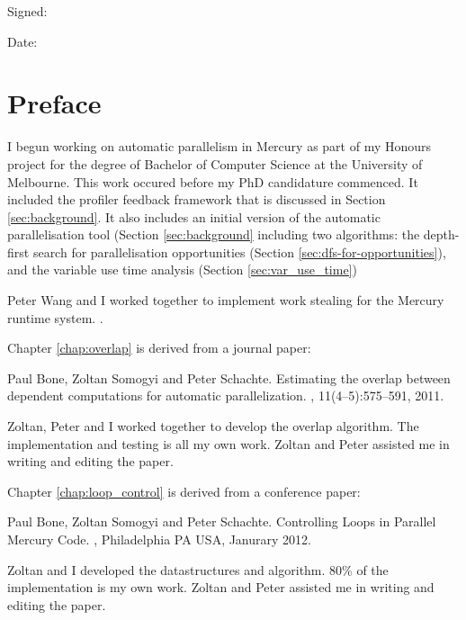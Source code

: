 \documentclass[a4paper,twoside]{report}
\begin{document}
\noindent Signed:

\vspace{1em}

\noindent Date:

\chapter*{Preface}

I begun working on automatic parallelism in Mercury as part of my Honours project
for the degree of Bachelor of Computer Science at the University of Melbourne.
This work occured before my PhD candidature commenced.
It included the profiler feedback framework that is discussed in Section
\ref{sec:background}.
It also includes an initial version of the automatic parallelisation tool
(Section \ref{sec:background}
including two algorithms:
the depth-first search for parallelisation opportunities
(Section \ref{sec:dfs-for-opportunities}),
and the variable use time analysis (Section \ref{sec:var_use_time})

Peter Wang and I worked together to implement work stealing for the Mercury
runtime system.
.

Chapter \ref{chap:overlap} is derived from a journal paper:

Paul Bone, Zoltan Somogyi and Peter Schachte.
\newblock Estimating the overlap between dependent computations for automatic
  parallelization.
, 11(4--5):575--591,
  2011.

Zoltan, Peter and I worked together to develop the overlap algorithm.
The implementation and testing is all my own work.
Zoltan and Peter assisted me in writing and editing the paper.

Chapter \ref{chap:loop_control} is derived from a conference paper:

Paul Bone, Zoltan Somogyi and Peter Schachte.
\newblock Controlling Loops in Parallel Mercury Code.
,
Philadelphia PA USA, Janurary 2012.

Zoltan and I developed the datastructures and algorithm.
80\% of the implementation is my own work.
Zoltan and Peter assisted me in writing and editing the paper.
\end{document}
